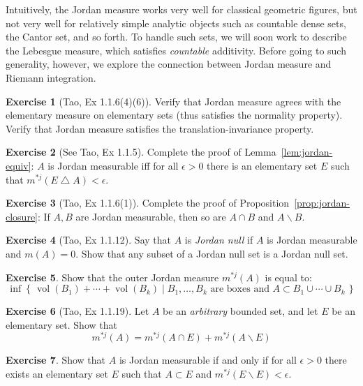 \documentclass[11pt,oneside]{amsbook}
\newcommand{\set}[1]{\left\{\,#1\,\right\}}
\renewcommand{\setminus}{\smallsetminus}
\renewcommand{\triangle}{\bigtriangleup}
\DeclareMathOperator{\vol}{vol}
\theoremstyle{definition}
\newtheorem{exerc}{Exercise}[section]
\theoremstyle{plain}
\theoremstyle{definition}
\theoremstyle{remark}
\numberwithin{equation}{section}
\numberwithin{figure}{section}
\begin{document}
Intuitively, the Jordan measure works very well for classical geometric figures, but not very well for relatively simple analytic objects such as countable dense sets, the Cantor set, and so forth. To handle such sets, we will soon work to describe the Lebesgue measure, which satisfies \emph{countable} additivity. Before going to such generality, however, we explore the connection between Jordan measure and Riemann integration.

\begin{exerc}[Tao, Ex 1.1.6(4)(6)]
  Verify that Jordan measure agrees with the elementary measure on elementary sets (thus satisfies the normality property). Verify that Jordan measure satisfies the translation-invariance property.
\end{exerc}

\begin{exerc}[See Tao, Ex 1.1.5]
  Complete the proof of Lemma~\ref{lem:jordan-equiv}: $A$ is Jordan measurable iff for all $\epsilon>0$ there is an elementary set $E$ such that $m^{*j}(E\triangle A)<\epsilon$.
\end{exerc}

\begin{exerc}[Tao, Ex 1.1.6(1)]
  Complete the proof of Proposition~\ref{prop:jordan-closure}: If $A,B$ are Jordan measurable, then so are $A\cap B$ and $A\setminus B$.
\end{exerc}

\begin{exerc}[Tao, Ex 1.1.12]
  Say that $A$ is \emph{Jordan null} if $A$ is Jordan measurable and $m(A)=0$. Show that any subset of a Jordan null set is a Jordan null set.
\end{exerc}

\begin{exerc}
  Show that the outer Jordan measure $m^{*j}(A)$ is equal to:
  \[\inf\set{\vol(B_1)+\cdots+\vol(B_k)\mid B_1,\ldots,B_k\text{ are boxes and }A\subset B_1\cup\cdots\cup B_k}
  \]
\end{exerc}

\begin{exerc}[Tao, Ex 1.1.19]
  Let $A$ be an \emph{arbitrary} bounded set, and let $E$ be an elementary set. Show that
  \[m^{*j}(A)=m^{*j}(A\cap E)+m^{*j}(A\setminus E)
  \]
\end{exerc}

\begin{exerc}
  Show that $A$ is Jordan measurable if and only if for all $\epsilon>0$ there exists an elementary set $E$ such that $A\subset E$ and $m^{*j}(E\setminus E)<\epsilon$.
\end{exerc}
\end{document}
